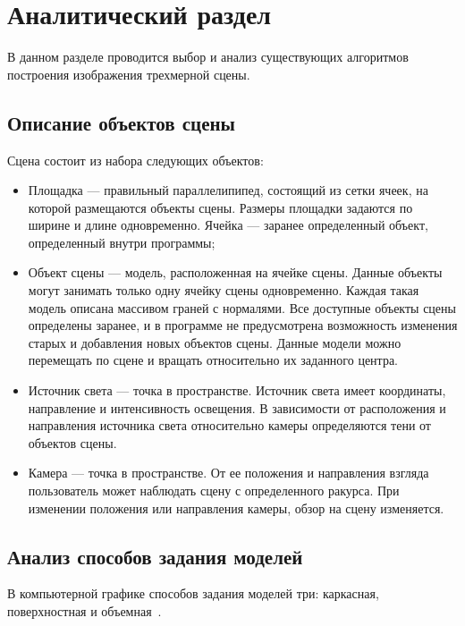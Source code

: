 \chapter{Аналитический раздел}

В данном разделе проводится выбор и анализ существующих алгоритмов построения изображения
трехмерной сцены.


\section{Описание объектов сцены}

Сцена состоит из набора следующих объектов:
\begin{itemize}
    \item Площадка --- правильный параллелипипед, состоящий из сетки ячеек, на
        которой размещаются объекты сцены. Размеры площадки задаются по ширине и 
        длине одновременно. Ячейка --- заранее определенный объект, определенный внутри
        программы;

    \item Объект сцены --- модель, расположенная на ячейке сцены. Данные объекты
        могут занимать только одну ячейку сцены одновременно. Каждая такая модель
        описана массивом граней с нормалями. Все доступные объекты сцены
        определены заранее, и в программе не предусмотрена возможность изменения
        старых и добавления новых объектов сцены. Данные модели можно
        перемещать по сцене и вращать относительно их заданного центра.

    \item Источник света --- точка в пространстве. Источник света имеет координаты,
        направление и интенсивность освещения. В зависимости от расположения
        и направления источника света относительно камеры определяются тени от объектов
        сцены.

    \item Камера --- точка в пространстве. От ее положения и направления взгляда
        пользователь может наблюдать сцену с определенного ракурса. При изменении
        положения или направления камеры, обзор на сцену изменяется.
\end{itemize}

\section{Анализ способов задания моделей}

В компьютерной графике способов задания моделей три: каркасная, поверхностная и
объемная~\cite{prilipenko:2005}.

